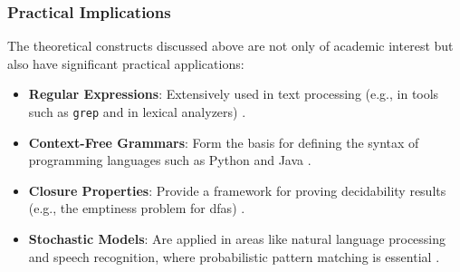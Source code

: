 \subsubsection{Practical Implications}
The theoretical constructs discussed above are not only of academic interest but also have significant practical applications:
\begin{itemize}
    \item \textbf{Regular Expressions}: Extensively used in text processing (e.g., in tools such as \texttt{grep} and in lexical analyzers) \cite{kernighan1984unix, hopcroft2006introduction}.
    \item \textbf{Context-Free Grammars}: Form the basis for defining the syntax of programming languages such as Python and Java \cite{chomsky1956three, hopcroft2006introduction}.
    \item \textbf{Closure Properties}: Provide a framework for proving decidability results (e.g., the emptiness problem for \glspl{dfa}) \cite{hopcroft2006introduction}.
    \item \textbf{Stochastic Models}: Are applied in areas like natural language processing and speech recognition, where probabilistic pattern matching is essential \cite{rabin1963probabilistic}.
\end{itemize}